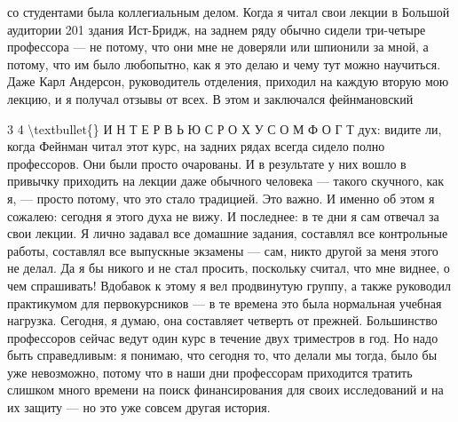 \documentclass[10pt,oneside]{article}
\begin{document}
со студентами была коллегиальным делом. Когда я читал свои лекции в Большой аудитории 201 здания Ист-Бридж, на заднем ряду обычно сидели три-четыре профессора --- не потому, что они мне не доверяли или шпионили за мной, а потому, что им было любопытно, как я это делаю и чему тут можно научиться. Даже Карл Андерсон, руководитель отделения, приходил на каждую вторую мою лекцию, и я получал отзывы от всех. В этом и заключался фейнмановский\par

3 4 \textbackslash{}textbullet\{\} И Н Т Е Р В Ь Ю  С  Р О Х У С О М  Ф О Г Т дух: видите ли, когда Фейнман читал этот курс, на задних рядах всегда сидело полно профессоров. Они были просто очарованы. И в результате у них вошло в привычку приходить на лекции даже обычного человека --- такого скучного, как я, --- просто потому, что это стало традицией. Это важно. И именно об этом я сожалею: сегодня я этого духа не вижу. И последнее: в те дни я сам отвечал за свои лекции. Я лично задавал все домашние задания, составлял все контрольные работы, составлял все выпускные экзамены --- сам, никто другой за меня этого не делал. Да я бы никого и не стал просить, поскольку считал, что мне виднее, о чем спрашивать! Вдобавок к этому я вел продвинутую группу, а также руководил практикумом для первокурсников --- в те времена это была нормальная учебная нагрузка. Сегодня, я думаю, она составляет четверть от прежней. Большинство профессоров сейчас ведут один курс в течение двух триместров в год. Но надо быть справедливым: я понимаю, что сегодня то, что делали мы тогда, было бы уже невозможно, потому что в наши дни профессорам приходится тратить слишком много времени на поиск финансирования для своих исследований и на их защиту --- но это уже совсем другая история.\par

\clearpage
{}
\end{document}
